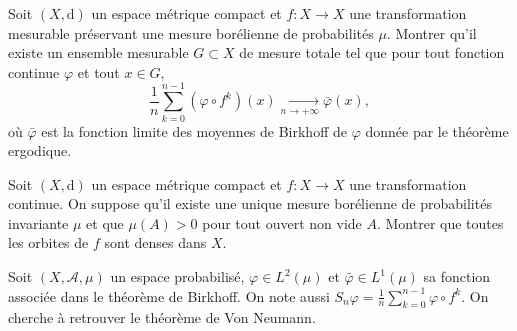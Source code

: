 \documentclass[a4paper,10pt,openany]{article}
\theoremstyle{plain}
\theoremstyle{definition}
\newcommand{\dd}{\mathrm{d}}
\newcommand{\C}{\mathbf{C}}
\begin{document}
 \vspace{1.5mm} 

\noindent Soit $(X, \dd)$ un espace m\'etrique compact et $f : X \to X$ une transformation mesurable pr\'eservant une mesure bor\'elienne de probabilit\'es $\mu$. Montrer qu'il existe un ensemble mesurable $G \subset X$ de mesure totale tel que pour tout fonction continue $\varphi$ et tout $x \in G$,
$$
\frac{1}{n} \sum_{k=0}^{n-1} \left(\varphi \circ f^k\right)(x) \underset{n \to +\infty}{\longrightarrow} \bar{\varphi}(x),
$$
o\`u $\bar{\varphi}$ est la fonction limite des moyennes de Birkhoff de $\varphi$ donn\'ee par le th\'eor\`eme ergodique.
 \vspace{0.1cm}

\vspace{0.6cm} 


\noindent Soit $(X, \dd)$ un espace m\'etrique compact et $f : X \to X$ une transformation continue. On suppose qu'il existe une unique mesure bor\'elienne de probabilit\'es invariante $\mu$ et que $\mu(A) > 0$ pour tout ouvert non vide $A$. Montrer que toutes les orbites de $f$ sont denses dans $X$. 
 \vspace{0.1cm}
 


\vspace{0.6cm}

 \vspace{1.5mm} 

\noindent Soit $(X, \mathscr{A}, \mu)$ un espace probabilis\'e, $\varphi \in L^2(\mu)$ et $\bar \varphi \in L^1(\mu)$ sa fonction associ\'ee dans le th\'eor\`eme de Birkhoff. On note aussi $\displaystyle{S_n\varphi = \frac{1}{n} \sum_{k=0}^{n-1} \varphi \circ f^k}$. On cherche \`a retrouver le th\'eor\`eme de Von Neumann.
\end{document}
